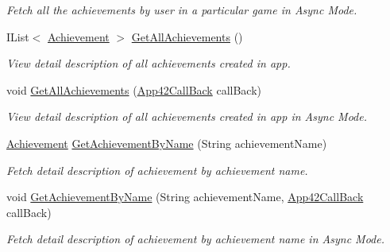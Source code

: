 \begin{DoxyCompactItemize}
\begin{DoxyCompactList}\small\item\em Fetch all the achievements by user in a particular game in Async Mode. \end{DoxyCompactList}\item 
I\+List$<$ \hyperlink{classcom_1_1shephertz_1_1app42_1_1paas_1_1sdk_1_1csharp_1_1achievement_1_1_achievement}{Achievement} $>$ \hyperlink{classcom_1_1shephertz_1_1app42_1_1paas_1_1sdk_1_1csharp_1_1achievement_1_1_achievement_service_a0dbd229c18b5ed8241e48dbd02b911cf}{Get\+All\+Achievements} ()
\begin{DoxyCompactList}\small\item\em View detail description of all achievements created in app. \end{DoxyCompactList}\item 
void \hyperlink{classcom_1_1shephertz_1_1app42_1_1paas_1_1sdk_1_1csharp_1_1achievement_1_1_achievement_service_ab77cfd321bac1e3b3f21d19ed51ad0a7}{Get\+All\+Achievements} (\hyperlink{interfacecom_1_1shephertz_1_1app42_1_1paas_1_1sdk_1_1csharp_1_1_app42_call_back}{App42\+Call\+Back} call\+Back)
\begin{DoxyCompactList}\small\item\em View detail description of all achievements created in app in Async Mode. \end{DoxyCompactList}\item 
\hyperlink{classcom_1_1shephertz_1_1app42_1_1paas_1_1sdk_1_1csharp_1_1achievement_1_1_achievement}{Achievement} \hyperlink{classcom_1_1shephertz_1_1app42_1_1paas_1_1sdk_1_1csharp_1_1achievement_1_1_achievement_service_a8a7f41df5220c9d40fe334a9a2509137}{Get\+Achievement\+By\+Name} (String achievement\+Name)
\begin{DoxyCompactList}\small\item\em Fetch detail description of achievement by achievement name. \end{DoxyCompactList}\item 
void \hyperlink{classcom_1_1shephertz_1_1app42_1_1paas_1_1sdk_1_1csharp_1_1achievement_1_1_achievement_service_a3503c8266de3aeca78869343a4ad828a}{Get\+Achievement\+By\+Name} (String achievement\+Name, \hyperlink{interfacecom_1_1shephertz_1_1app42_1_1paas_1_1sdk_1_1csharp_1_1_app42_call_back}{App42\+Call\+Back} call\+Back)
\begin{DoxyCompactList}\small\item\em Fetch detail description of achievement by achievement name in Async Mode. \end{DoxyCompactList}\item 

\end{DoxyCompactItemize}
